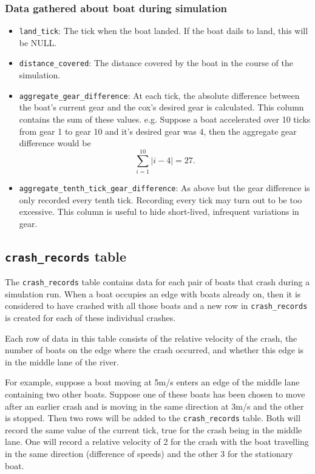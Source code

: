 \subsubsection{Data gathered about boat during simulation}
\begin{itemize}
  \item{\texttt{land\_tick}:} The tick when the boat landed. If the boat dails
    to land, this will be NULL.
  \item{\texttt{distance\_covered}:} The distance covered by the boat in the
    course of the simulation.
  \item{\texttt{aggregate\_gear\_difference}:} At each tick, the absolute
    difference between the boat's current gear and the cox's desired
    gear is calculated. This column contains the sum of these values. e.g. Suppose a boat accelerated over 10 ticks from gear 1 to gear 10 and it's desired gear was 4, then the aggregate gear difference would be 
    \[\sum_{i=1}^{10} |i - 4| = 27.\]
  \item{\texttt{aggregate\_tenth\_tick\_gear\_difference}:} As above but the
    gear difference is only recorded every tenth tick. Recording every
    tick may turn out to be too excessive. This column is useful to
    hide short-lived, infrequent variations in gear.
\end{itemize}

\subsection{\texttt{crash\_records} table}

The \texttt{crash\_records} table contains data for each pair of boats that crash during a simulation run. When a boat occupies an edge with boats already on, then it is considered to have crashed with all those boats and a new row in \texttt{crash\_records} is created for each of these individual crashes. 

Each row of data in this table consists of the relative velocity of the crash, the number of boats on the edge where the crash occurred, and whether this edge is in the middle lane of the river. 

For example, suppose a boat moving at 5m/s enters an edge of the middle lane containing two other boats. Suppose one of these boats has been chosen to move after an earlier crash and is moving in the same direction at 3m/s and the other is stopped. Then two rows will be added to the \texttt{crash\_records} table. Both will record the same value of the current tick, true for the crash being in the middle lane. One will record a relative velocity of 2 for the crash with the boat travelling in the same direction (difference of speeds) and the other 3 for the stationary boat.


